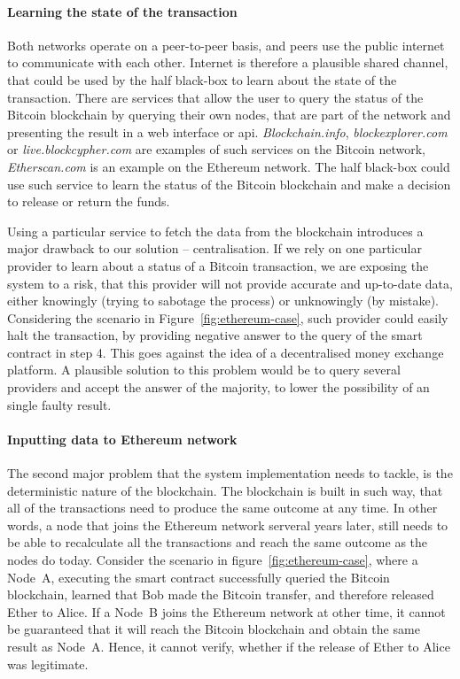 \paragraph{Learning the state of the transaction}
Both networks operate on a peer-to-peer basis, and peers use the public internet to communicate with each other. Internet is therefore a plausible shared channel, that could be used by the half black-box to learn about the state of the transaction. There are services that allow the user to query the status of the Bitcoin blockchain by querying their own nodes, that are part of the network and presenting the result in a web interface or \acrshort{api}. \textit{Blockchain.info}, \textit{blockexplorer.com} or \textit{live.blockcypher.com} are examples of such services on the Bitcoin network, \textit{Etherscan.com} is an example on the Ethereum network. The half black-box could use such service to learn the status of the Bitcoin blockchain and make a decision to release or return the funds.

Using a particular service to fetch the data from the blockchain introduces a major drawback to our solution -- centralisation. If we rely on one particular provider to learn about a status of a Bitcoin transaction, we are exposing the system to a risk, that this provider will not provide accurate and up-to-date data, either knowingly (trying to sabotage the process) or unknowingly (by mistake). Considering the scenario in Figure~\ref{fig:ethereum-case}, such provider could easily halt the transaction, by providing negative answer to the query of the smart contract in step 4. This goes against the idea of a decentralised money exchange platform. A plausible solution to this problem would be to query several providers and accept the answer of the majority, to lower the possibility of an single faulty result.

\paragraph{Inputting data to Ethereum network}
The second major problem that the system implementation needs to tackle, is the deterministic nature of the blockchain. The blockchain is built in such way, that all of the transactions need to produce the same outcome at any time. In other words, a node that joins the Ethereum network serveral years later, still needs to be able to recalculate all the transactions and reach the same outcome as the nodes do today. Consider the scenario in figure~\ref{fig:ethereum-case}, where a Node~A, executing the smart contract successfully queried the Bitcoin blockchain, learned that Bob made the Bitcoin transfer, and therefore released Ether to Alice. If a Node~B joins the Ethereum network at other time, it cannot be guaranteed that it will reach the Bitcoin blockchain and obtain the same result as Node~A. Hence, it cannot verify, whether if the release of Ether to Alice was legitimate.

